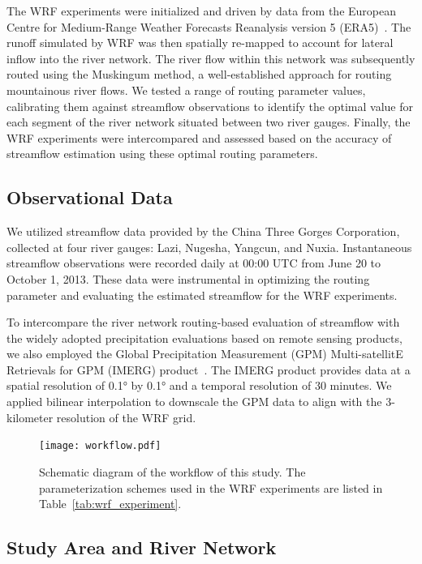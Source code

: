 \documentclass[draft]{agujournal2019}
\begin{document}
The WRF experiments were initialized and driven by data from the European Centre for Medium-Range Weather Forecasts Reanalysis version 5 (ERA5)~\cite{hersbach2020QJRMS}. The runoff simulated by WRF was then spatially re-mapped to account for lateral inflow into the river network. The river flow within this network was subsequently routed using the Muskingum method, a well-established approach for routing mountainous river flows. We tested a range of routing parameter values, calibrating them against streamflow observations to identify the optimal value for each segment of the river network situated between two river gauges. Finally, the WRF experiments were intercompared and assessed based on the accuracy of streamflow estimation using these optimal routing parameters.

\subsection{Observational Data}

We utilized streamflow data provided by the China Three Gorges Corporation, collected at four river gauges: Lazi, Nugesha, Yangcun, and Nuxia. Instantaneous streamflow observations were recorded daily at 00:00 UTC from June 20 to October 1, 2013. These data were instrumental in optimizing the routing parameter and evaluating the estimated streamflow for the WRF experiments.

To intercompare the river network routing-based evaluation of streamflow with the widely adopted precipitation evaluations based on remote sensing products, we also employed the Global Precipitation Measurement (GPM) Multi-satellitE Retrievals for GPM (IMERG) product~\cite{huffman2019GPM}. The IMERG product provides data at a spatial resolution of 0.1° by 0.1° and a temporal resolution of 30 minutes. We applied bilinear interpolation to downscale the GPM data to align with the 3-kilometer resolution of the WRF grid.

\begin{figure}[h!]
  \centering
  \noindent\texttt{[image: workflow.pdf]}
  \caption{Schematic diagram of the workflow of this study. The parameterization schemes used in the WRF experiments are listed in Table~\ref{tab:wrf_experiment}.}\label{fig:workflow}
\end{figure}

\subsection{Study Area and River Network}
\end{document}
